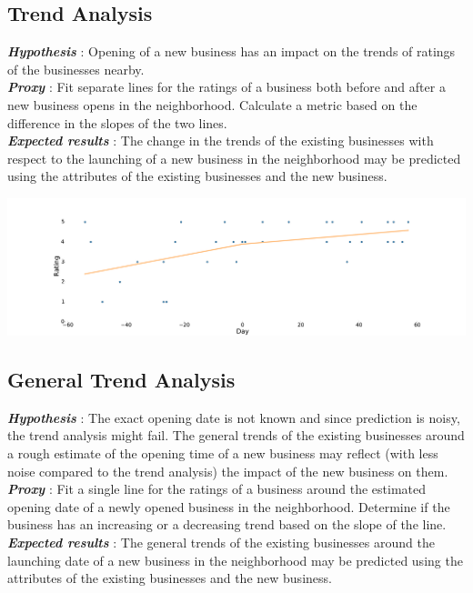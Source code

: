 \documentclass[a0,landscape,beamer]{a0poster}
\begin{document}
\begin{multicols}{4}
\subsection*{Trend Analysis}
\textbf{\textit{Hypothesis}} : Opening of a new business has an impact on the trends of ratings of the businesses nearby.\\
\textbf{\textit{Proxy}} : Fit separate lines for the ratings of a business both before and after a new business opens in the neighborhood. Calculate a metric based on the difference in the slopes of the two lines.\\
\textbf{\textit{Expected results}} : The change in the trends of the existing businesses with respect to the launching  of a new business in the neighborhood may be predicted using the attributes of the existing businesses and the new business. 

\begin{center}
\includegraphics[width=\linewidth]{../trend.pdf}
\end{center}


\subsection*{General Trend Analysis}
\textbf{\textit{Hypothesis}} : The exact opening date is not known and since prediction is noisy, the trend analysis might fail. The general trends of the existing businesses around a rough estimate of the opening time of a new business may reflect (with less noise compared to the trend analysis) the impact of the new business on them.\\
\textbf{\textit{Proxy}} : Fit a single line for the ratings of a business around the estimated opening date of a newly opened business in the neighborhood. Determine if the business has an increasing or a decreasing trend based on the slope of the line.\\
\textbf{\textit{Expected results}} : The general trends of the existing businesses around the launching date of a new business in the neighborhood may be predicted using the attributes of the existing businesses and the new business. 


\end{multicols}
\end{document}
